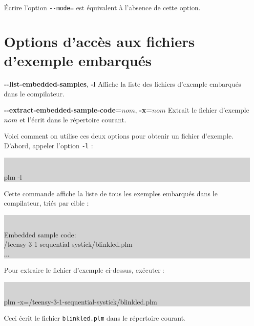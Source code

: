 Écrire l'option \texttt{-{}-mode=} est équivalent à l'absence de cette option.






\section{Options d'accès aux fichiers d'exemple embarqués}

{\ttfamily\bfseries-{}-list-embedded-samples}, {\ttfamily\bfseries-l} Affiche la liste des fichiers d'exemple embarqués dans le compilateur.

{\ttfamily\bfseries-{}-extract-embedded-sample-code=$nom$}, {\ttfamily\bfseries-x=$nom$} Extrait le fichier d'exemple $nom$ et l'écrit dans le répertoire courant.

Voici comment on utilise ces deux options pour obtenir un fichier d'exemple. D'abord, appeler l'option \texttt{-l} :


\colorbox{lightgray}{\tt
\begin{minipage}{1.0\linewidth}
 plm -l
\end{minipage}
}

Cette commande affiche la liste de tous les exemples embarqués dans le compilateur, triés par cible :

\colorbox{lightgray}{\tt
\begin{minipage}{1.0\linewidth}
Embedded sample code:\\ 
\hspace*{1.2em}/teensy-3-1-sequential-systick/blinkled.plm\\
\hspace*{1.2em}...
\end{minipage}
}

Pour extraire le fichier d'exemple ci-dessus, exécuter :

\colorbox{lightgray}{\tt
\begin{minipage}{1.0\linewidth}
plm -x=/teensy-3-1-sequential-systick/blinkled.plm
\end{minipage}
}

Ceci écrit le fichier \texttt{blinkled.plm} dans le répertoire courant.

